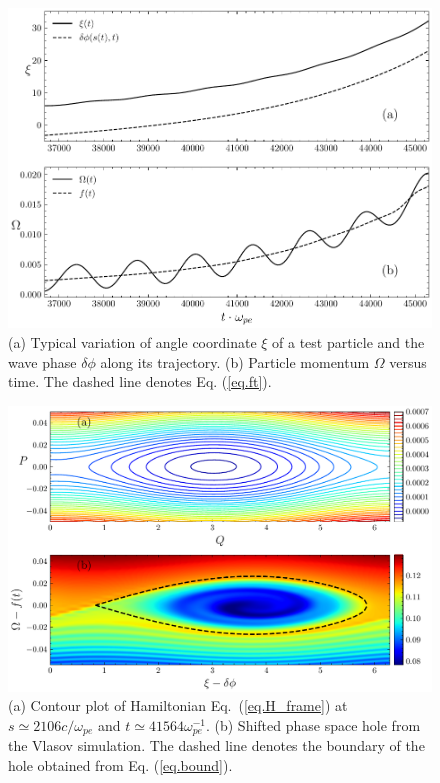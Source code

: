 \begin{figure}
    \centering
    \includegraphics[scale=0.5]{img/phaseflow.pdf}
    \caption{
    (a) Typical variation of angle coordinate $\xi$ of a test particle and the  wave phase $\delta \phi$ along its trajectory.  (b) Particle momentum $\Omega$ versus time. The dashed line denotes Eq. (\ref{eq.ft}).
    \label{fig.phaseflow}
    }
\end{figure}

\begin{figure}
     \centering
     \includegraphics[scale=0.5]{img/Ham_and_f.pdf}
     \caption{(a)  
     Contour plot of  Hamiltonian 
Eq.~(\ref{eq.H_frame}) at $s\simeq2106c/\omega_{pe}$ and $t\simeq41564\omega_{pe}^{-1}$. 
 (b) Shifted phase space hole from the Vlasov simulation. The dashed line denotes the boundary of the hole obtained from Eq. (\ref{eq.bound}).
     \label{fig.hole}
     }
 \end{figure}

